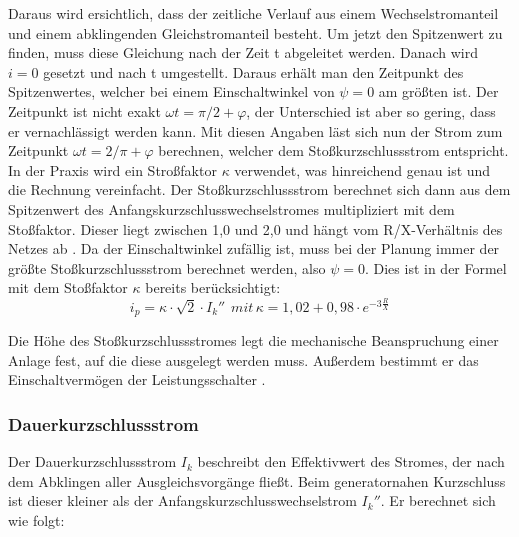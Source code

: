 \documentclass{scrartcl}
\begin{document}
\begin{onehalfspace}
Daraus wird ersichtlich, dass der zeitliche Verlauf aus einem Wechselstromanteil und einem abklingenden Gleichstromanteil besteht. Um jetzt den Spitzenwert zu finden, muss diese Gleichung nach der Zeit t abgeleitet werden. Danach wird $i = 0$ gesetzt und nach t umgestellt. Daraus erhält man den Zeitpunkt des Spitzenwertes, welcher bei einem Einschaltwinkel von $\psi = 0$ am größten ist. Der Zeitpunkt ist nicht exakt $\omega t = \pi/2 + \varphi$, der Unterschied ist aber so gering, dass er vernachlässigt werden kann. Mit diesen Angaben läst sich nun der Strom zum Zeitpunkt $\omega t = 2/\pi + \varphi$ berechnen, welcher dem Stoßkurzschlussstrom entspricht.\\
In der Praxis wird ein Stroßfaktor $\kappa$ verwendet, was hinreichend genau ist und die Rechnung vereinfacht.
Der Stoßkurzschlussstrom berechnet sich dann aus dem Spitzenwert des Anfangskurzschlusswechselstromes multipliziert mit dem Stoßfaktor. Dieser liegt zwischen 1,0 und 2,0 und hängt vom R/X-Verhältnis des Netzes ab \cite[S. 246]{Funk1962}.
Da der Einschaltwinkel zufällig ist, muss bei der Planung immer der größte Stoßkurzschlussstrom berechnet werden, also $\psi = 0$. Dies ist in der Formel mit dem Stoßfaktor $\kappa$ bereits berücksichtigt: \\

\begin{equation}
i_p = \kappa \cdot \sqrt{2} \cdot I_k'' \hspace{5pt} mit \hspace{2pt} \kappa = 1,02 + 0,98 \cdot e^{-3 \frac{R}{X}}
\end{equation}

Die Höhe des Stoßkurzschlussstromes legt die mechanische Beanspruchung einer Anlage fest, auf die diese ausgelegt werden muss. Außerdem bestimmt er das Einschaltvermögen der Leistungsschalter \cite[S. 519]{Oeding2011}. \\

\subsubsection{Dauerkurzschlussstrom}
Der Dauerkurzschlussstrom $I_k$ beschreibt den Effektivwert des Stromes, der nach dem Abklingen aller Ausgleichsvorgänge fließt. Beim generatornahen Kurzschluss ist dieser kleiner als der Anfangskurzschlusswechselstrom $I_k''$. Er berechnet sich wie folgt:


\end{onehalfspace}
\end{document}
